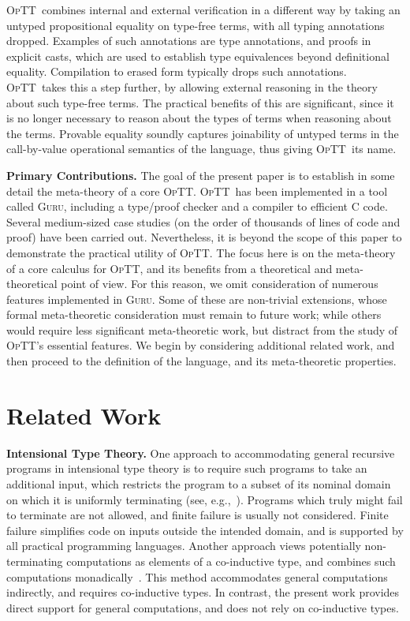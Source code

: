 \documentclass{fundam}
\newcommand{\optt}{\textsc{OpTT}}
\begin{document}
\optt\ combines internal and external verification in a different way
by taking an untyped propositional equality on type-free terms, with
all typing annotations dropped.  Examples of such annotations are type
annotations, and proofs in explicit casts, which are used to establish
type equivalences beyond definitional equality.  Compilation to erased
form typically drops such annotations.  \optt\ takes this a step
further, by allowing external reasoning in the theory about such
type-free terms.  The practical benefits of this are significant,
since it is no longer necessary to reason about the types of terms
when reasoning about the terms.  Provable equality soundly captures
joinability of untyped terms in the call-by-value operational
semantics of the language, thus giving \optt\ its name.

\textbf{Primary Contributions.} The goal of the present paper is to
establish in some detail the meta-theory of a core \optt.  \optt\ has
been implemented in a tool called \textsc{Guru}, including a
type/proof checker and a compiler to efficient C code.  Several
medium-sized case studies (on the order of thousands of lines of code
and proof) have been carried out.  Nevertheless, it is beyond the
scope of this paper to demonstrate the practical utility of \optt.
The focus here is on the meta-theory of a core calculus for \optt, and
its benefits from a theoretical and meta-theoretical point of view.
For this reason, we omit consideration of numerous features
implemented in \textsc{Guru}.  Some of these are non-trivial
extensions, whose formal meta-theoretic consideration must remain to
future work; while others would require less significant
meta-theoretic work, but distract from the study of \optt's essential
features.  We begin by considering additional related work, and then
proceed to the definition of the language, and its meta-theoretic
properties.

\section{Related Work}

\textbf{Intensional Type Theory.} One approach to accommodating
general recursive programs in intensional type theory is to require
such programs to take an additional input, which restricts the program
to a subset of its nominal domain on which it is uniformly terminating
(see, e.g.,~\cite{bove+05}).  Programs which truly might fail to
terminate are not allowed, and finite failure is usually not
considered.  Finite failure simplifies code on inputs outside the
intended domain, and is supported by all practical programming
languages.  Another approach views potentially non-terminating
computations as elements of a co-inductive type, and combines such
computations monadically~\cite{capretta05}.  This method accommodates
general computations indirectly, and requires co-inductive types.  In
contrast, the present work provides direct support for general
computations, and does not rely on co-inductive types.
\end{document}

